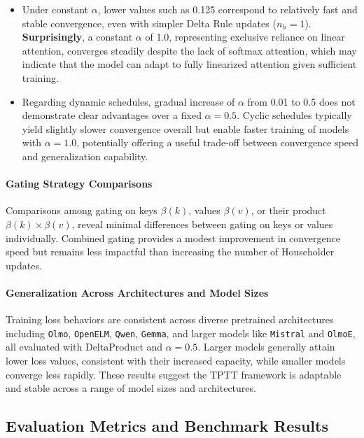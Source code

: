\documentclass[10pt,a4paper]{article}
\begin{document}
\begin{itemize}
    \item Under constant \(\alpha\), lower values such as 0.125 correspond to relatively fast and stable convergence, even with simpler Delta Rule updates (\(n_h=1\)). \textbf{Surprisingly}, a constant \(\alpha\) of 1.0, representing exclusive reliance on linear attention, converges steadily despite the lack of softmax attention, which may indicate that the model can adapt to fully linearized attention given sufficient training.
    \item Regarding dynamic schedules, gradual increase of \(\alpha\) from 0.01 to 0.5 does not demonstrate clear advantages over a fixed \(\alpha = 0.5\). Cyclic schedules typically yield slightly slower convergence overall but enable faster training of models with \(\alpha=1.0\), potentially offering a useful trade-off between convergence speed and generalization capability.
\end{itemize}

\paragraph{Gating Strategy Comparisons}

Comparisons among gating on keys \(\beta(k)\), values \(\beta(v)\), or their product \(\beta(k) \times \beta(v)\), reveal minimal differences between gating on keys or values individually. Combined gating provides a modest improvement in convergence speed but remains less impactful than increasing the number of Householder updates.

\paragraph{Generalization Across Architectures and Model Sizes}

Training loss behaviors are consistent across diverse pretrained architectures including \texttt{Olmo}, \texttt{OpenELM}, \texttt{Qwen}, \texttt{Gemma}, and larger models like \texttt{Mistral} and \texttt{OlmoE}, all evaluated with DeltaProduct and \(\alpha=0.5\). Larger models generally attain lower loss values, consistent with their increased capacity, while smaller models converge less rapidly. These results suggest the TPTT framework is adaptable and stable across a range of model sizes and architectures.


\subsection{Evaluation Metrics and Benchmark Results}
\end{document}
